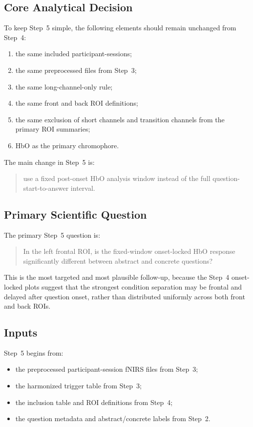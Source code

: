 \subsection{Core Analytical Decision}
To keep Step~5 simple, the following elements should remain unchanged from Step~4:
\begin{enumerate}
    \item the same included participant-sessions;
    \item the same preprocessed files from Step~3;
    \item the same long-channel-only rule;
    \item the same front and back ROI definitions;
    \item the same exclusion of short channels and transition channels from the primary ROI summaries;
    \item HbO as the primary chromophore.
\end{enumerate}

The main change in Step~5 is:
\begin{quote}
use a fixed post-onset HbO analysis window instead of the full question-start-to-answer interval.
\end{quote}

\subsection{Primary Scientific Question}
The primary Step~5 question is:
\begin{quote}
In the left frontal ROI, is the fixed-window onset-locked HbO response significantly different
between abstract and concrete questions?
\end{quote}

This is the most targeted and most plausible follow-up, because the Step~4 onset-locked plots suggest
that the strongest condition separation may be frontal and delayed after question onset, rather than
distributed uniformly across both front and back ROIs.

\subsection{Inputs}
Step~5 begins from:
\begin{itemize}
    \item the preprocessed participant-session fNIRS files from Step~3;
    \item the harmonized trigger table from Step~3;
    \item the inclusion table and ROI definitions from Step~4;
    \item the question metadata and abstract/concrete labels from Step~2.
\end{itemize}

